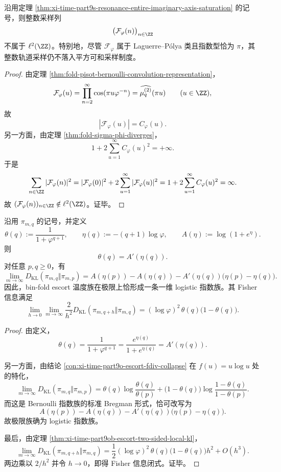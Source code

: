\begin{corollary}[黄金共振整函数的整数采样越过平方可和阈值]\label{cor:xi-time-part9s-resonance-entire-integer-sampling-not-l2}
沿用定理 \ref{thm:xi-time-part9s-resonance-entire-imaginary-axis-saturation} 的记号，则整数采样列
\[
\bigl(\mathcal F_\varphi(n)\bigr)_{n\in\ZZ}
\]
不属于 \(\ell^2(\ZZ)\)。特别地，尽管 \(\mathcal F_\varphi\) 属于 Laguerre--P\'olya 类且指数型恰为 \(\pi\)，其整数轨道采样仍不落入平方可和采样制度。
\end{corollary}
\begin{proof}
由定理 \ref{thm:fold-pisot-bernoulli-convolution-representation}，
\[
\mathcal F_\varphi(u)
=
\prod_{n=2}^{\infty}\cos(\pi u\varphi^{-n})
=
\widehat{\mu_q^{(2)}}(\pi u)
\qquad (u\in\ZZ),
\]
故
\[
|\mathcal F_\varphi(u)|=C_\varphi(u).
\]
另一方面，由定理 \ref{thm:fold-sigma-phi-diverges}，
\[
1+2\sum_{u=1}^{\infty}C_\varphi(u)^2=+\infty.
\]
于是
\[
\sum_{n\in\ZZ}|\mathcal F_\varphi(n)|^2
=
|\mathcal F_\varphi(0)|^2+2\sum_{u=1}^{\infty}|\mathcal F_\varphi(u)|^2
=
1+2\sum_{u=1}^{\infty}C_\varphi(u)^2
=
\infty.
\]
故 \((\mathcal F_\varphi(n))_{n\in\ZZ}\notin\ell^2(\ZZ)\)。证毕。
\end{proof}

\begin{theorem}\label{thm:xi-time-part9s-escort-logistic-expfamily-bregman}
沿用 \(\pi_{m,q}\) 的记号，并定义
\[
\theta(q):=\frac{1}{1+\varphi^{q+1}},
\qquad
\eta(q):=-(q+1)\log\varphi,
\qquad
A(\eta):=\log(1+e^\eta).
\]
则
\[
\theta(q)=A'(\eta(q)).
\]
对任意 \(p,q\ge 0\)，有
\[
\lim_{m\to\infty}D_{\mathrm{KL}}(\pi_{m,q}\Vert \pi_{m,p})
=
A(\eta(p))-A(\eta(q))-A'(\eta(q))\bigl(\eta(p)-\eta(q)\bigr).
\]
因此，bin-fold escort 温度族在极限上恰形成一条一维 logistic 指数族。其 Fisher 信息满足
\[
\lim_{h\to 0}\lim_{m\to\infty}
\frac{2}{h^2}D_{\mathrm{KL}}(\pi_{m,q+h}\Vert \pi_{m,q})
=
(\log\varphi)^2\,\theta(q)\bigl(1-\theta(q)\bigr).
\]
\end{theorem}
\begin{proof}
由定义，
\[
\theta(q)
=
\frac{1}{1+\varphi^{q+1}}
=
\frac{e^{\eta(q)}}{1+e^{\eta(q)}}
=
A'(\eta(q)).
\]

另一方面，由结论 \ref{con:xi-time-part9o-escort-fdiv-collapse} 在
\(
f(u)=u\log u
\)
处的特化，
\[
\lim_{m\to\infty}D_{\mathrm{KL}}(\pi_{m,q}\Vert \pi_{m,p})
=
\theta(q)\log\frac{\theta(q)}{\theta(p)}
+
\bigl(1-\theta(q)\bigr)
\log\frac{1-\theta(q)}{1-\theta(p)}.
\]
而这是 Bernoulli 指数族的标准 Bregman 形式，恰可改写为
\[
A(\eta(p))-A(\eta(q))-A'(\eta(q))\bigl(\eta(p)-\eta(q)\bigr).
\]
故极限族确为 logistic 指数族。

最后，由定理 \ref{thm:xi-time-part9ob-escort-two-sided-local-kl}，
\[
\lim_{m\to\infty}D_{\mathrm{KL}}(\pi_{m,q+h}\Vert \pi_{m,q})
=
\frac12(\log\varphi)^2\,\theta(q)\bigl(1-\theta(q)\bigr)h^2+O(h^3).
\]
两边乘以 \(2/h^2\) 并令 \(h\to 0\)，即得 Fisher 信息闭式。证毕。
\end{proof}

